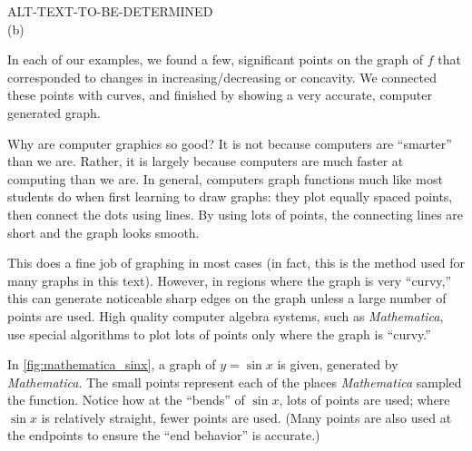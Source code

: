 \begin{example}
\begin{enumerate}
{{}{ALT-TEXT-TO-BE-DETERMINED}
\\[10pt](b)}
%
\end{enumerate}
\end{example}

In each of our examples, we found a few, significant points on the graph of $f$ that corresponded to changes in increasing/decreasing or concavity. We connected these points with curves, and finished by showing a very accurate, computer generated graph. 

Why are computer graphics so good? It is not because computers are ``smarter'' than we are. Rather, it is largely because computers are much faster at computing than we are. In general, computers graph functions much like most students do when first learning to draw graphs: they plot equally spaced points, then connect the dots using lines. By using lots of points, the connecting lines are short and the graph looks smooth. 

This does a fine job of graphing in most cases (in fact, this is the method used for many graphs in this text). However, in regions where the graph is very ``curvy,'' this can generate noticeable sharp edges on the graph unless a large number of points are used. High quality computer algebra systems, such as \textit{Mathematica}, use special algorithms to plot lots of points only where the graph is ``curvy.''

In \autoref{fig:mathematica_sinx}, a graph of $y=\sin x$ is given, generated by \textit{Mathematica}. The small points represent each of the places \textit{Mathematica} sampled the function. Notice how at the ``bends'' of $\sin x$, lots of points are used; where $\sin x$ is relatively straight, fewer points are used. (Many points are also used at the endpoints to ensure the ``end behavior'' is accurate.) 

